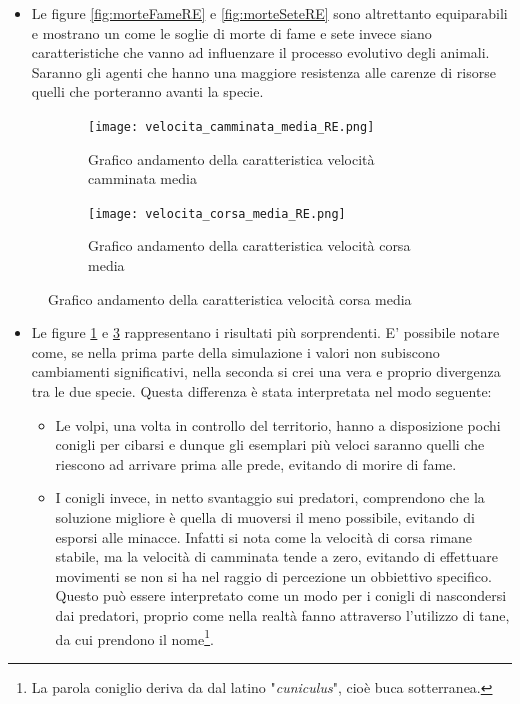 \documentclass[11pt]{article}
\begin{document}
\begin{itemize}


    \item Le figure \ref{fig:morteFameRE} e \ref{fig:morteSeteRE} sono altrettanto equiparabili e mostrano un come le soglie di morte di fame e sete invece siano caratteristiche che vanno ad influenzare il processo evolutivo degli animali. Saranno gli agenti che hanno una maggiore resistenza alle carenze di risorse quelli che porteranno avanti la specie. 
    
\end{itemize}

\newpage 

\begin{figure}[ht!]
		\hspace{-5mm}
	\begin{subfigure}{.52\textwidth}
         \centering
         \texttt{[image: velocita\_camminata\_media\_RE.png]}
         \caption{Grafico andamento della caratteristica velocità camminata media}
         \label{fig:camminataRE}
	\end{subfigure}
	\begin{subfigure}{.55\textwidth}
		\hspace{12mm}
		\centering
        \texttt{[image: velocita\_corsa\_media\_RE.png]}
        \caption{Grafico andamento della caratteristica velocità corsa media}
        \label{fig:corsaRE}
	\end{subfigure}
\end{figure}

\begin{itemize}


    \item Le figure \ref{fig:camminataRE} e \ref{fig:corsaRE} rappresentano i risultati più sorprendenti. E' possibile notare come, se nella prima parte della simulazione i valori non subiscono cambiamenti significativi, nella seconda si crei una vera e proprio divergenza tra le due specie. Questa differenza è stata interpretata nel modo seguente:
    \begin{itemize}
        \item Le volpi, una volta in controllo del territorio, hanno a disposizione pochi conigli per cibarsi e dunque gli esemplari più veloci saranno quelli che riescono ad arrivare prima alle prede, evitando di morire di fame.
        \item I conigli invece, in netto svantaggio sui predatori, comprendono che la soluzione migliore è quella di muoversi il meno possibile, evitando di esporsi alle minacce. Infatti si nota come la velocità di corsa rimane stabile, ma la velocità di camminata tende a zero, evitando di effettuare movimenti se non si ha nel raggio di percezione un obbiettivo specifico. Questo può essere interpretato come un modo per i conigli di nascondersi dai predatori, proprio come nella realtà fanno attraverso l'utilizzo di tane, da cui prendono il nome\footnote{La parola coniglio deriva da dal latino "\textit{cuniculus}", cioè buca sotterranea.\cite{WikiConiglio} }. 
    \end{itemize}

\end{itemize}
\end{document}
